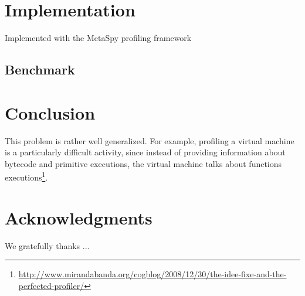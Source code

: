 \documentclass[runningheads]{llncs}
\newcommand{\seclabel}[1]{\label{sec:#1}}
\begin{document}
\section{Implementation}\seclabel{implementation}

Implemented with the MetaSpy profiling framework

\subsection{Benchmark}	
	
\section{Conclusion}\seclabel{conclusion}

This problem is rather well generalized. For example, profiling a virtual machine is a particularly difficult activity, since instead of providing information about bytecode and primitive executions, the virtual machine talks about functions executions\footnote{\url{http://www.mirandabanda.org/cogblog/2008/12/30/the-idee-fixe-and-the-perfected-profiler/}}.

\section*{Acknowledgments}

\small We gratefully thanks ...



\end{document}
